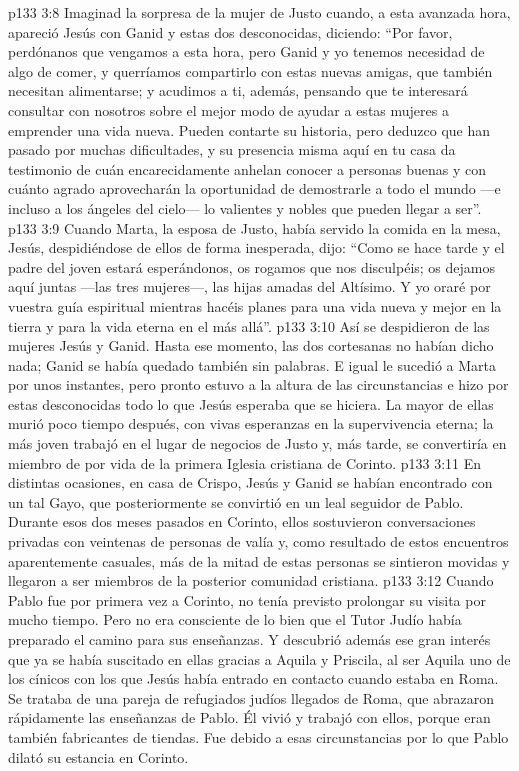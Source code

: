 \vs p133 3:8 Imaginad la sorpresa de la mujer de Justo cuando, a esta avanzada hora, apareció Jesús con Ganid y estas dos desconocidas, diciendo: “Por favor, perdónanos que vengamos a esta hora, pero Ganid y yo tenemos necesidad de algo de comer, y querríamos compartirlo con estas nuevas amigas, que también necesitan alimentarse; y acudimos a ti, además, pensando que te interesará consultar con nosotros sobre el mejor modo de ayudar a estas mujeres a emprender una vida nueva. Pueden contarte su historia, pero deduzco que han pasado por muchas dificultades, y su presencia misma aquí en tu casa da testimonio de cuán encarecidamente anhelan conocer a personas buenas y con cuánto agrado aprovecharán la oportunidad de demostrarle a todo el mundo ---e incluso a los ángeles del cielo--- lo valientes y nobles que pueden llegar a ser”.
\vs p133 3:9 Cuando Marta, la esposa de Justo, había servido la comida en la mesa, Jesús, despidiéndose de ellos de forma inesperada, dijo: “Como se hace tarde y el padre del joven estará esperándonos, os rogamos que nos disculpéis; os dejamos aquí juntas ---las tres mujeres---, las hijas amadas del Altísimo. Y yo oraré por vuestra guía espiritual mientras hacéis planes para una vida nueva y mejor en la tierra y para la vida eterna en el más allá”.
\vs p133 3:10 Así se despidieron de las mujeres Jesús y Ganid. Hasta ese momento, las dos cortesanas no habían dicho nada; Ganid se había quedado también sin palabras. E igual le sucedió a Marta por unos instantes, pero pronto estuvo a la altura de las circunstancias e hizo por estas desconocidas todo lo que Jesús esperaba que se hiciera. La mayor de ellas murió poco tiempo después, con vivas esperanzas en la supervivencia eterna; la más joven trabajó en el lugar de negocios de Justo y, más tarde, se convertiría en miembro de por vida de la primera Iglesia cristiana de Corinto.
\vs p133 3:11 En distintas ocasiones, en casa de Crispo, Jesús y Ganid se habían encontrado con un tal Gayo, que posteriormente se convirtió en un leal seguidor de Pablo. Durante esos dos meses pasados en Corinto, ellos sostuvieron conversaciones privadas con veintenas de personas de valía y, como resultado de estos encuentros aparentemente casuales, más de la mitad de estas personas se sintieron movidas y llegaron a ser miembros de la posterior comunidad cristiana.
\vs p133 3:12 Cuando Pablo fue por primera vez a Corinto, no tenía previsto prolongar su visita por mucho tiempo. Pero no era consciente de lo bien que el Tutor Judío había preparado el camino para sus enseñanzas. Y descubrió además ese gran interés que ya se había suscitado en ellas gracias a Aquila y Priscila, al ser Aquila uno de los cínicos con los que Jesús había entrado en contacto cuando estaba en Roma. Se trataba de una pareja de refugiados judíos llegados de Roma, que abrazaron rápidamente las enseñanzas de Pablo. Él vivió y trabajó con ellos, porque eran también fabricantes de tiendas. Fue debido a esas circunstancias por lo que Pablo dilató su estancia en Corinto.
